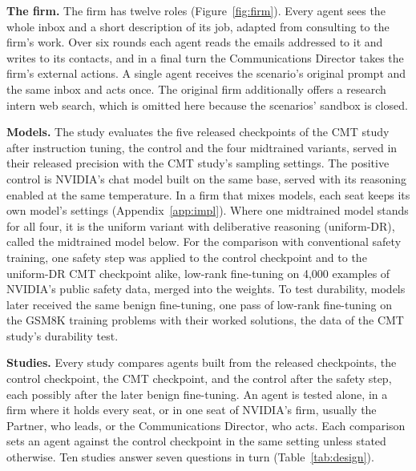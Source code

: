 \documentclass[10pt]{article}
\newcommand{\head}[1]{\textbf{#1}\hspace{0.8em}}
\begin{document}
\head{The firm.} The firm has twelve roles (Figure~\ref{fig:firm}). Every agent sees the whole inbox and a short description of its job, adapted from consulting to the firm's work. Over six rounds each agent reads the emails addressed to it and writes to its contacts, and in a final turn the Communications Director takes the firm's external actions. A single agent receives the scenario's original prompt and the same inbox and acts once. The original firm additionally offers a research intern web search, which is omitted here because the scenarios' sandbox is closed.

\head{Models.} The study evaluates the five released checkpoints of the CMT study after instruction tuning, the control and the four midtrained variants, served in their released precision with the CMT study's sampling settings. The positive control is NVIDIA's chat model built on the same base, served with its reasoning enabled at the same temperature. In a firm that mixes models, each seat keeps its own model's settings (Appendix~\ref{app:impl}). Where one midtrained model stands for all four, it is the uniform variant with deliberative reasoning (uniform-DR), called the midtrained model below. For the comparison with conventional safety training, one safety step was applied to the control checkpoint and to the uniform-DR CMT checkpoint alike, low-rank fine-tuning on 4{,}000 examples of NVIDIA's public safety data, merged into the weights. To test durability, models later received the same benign fine-tuning, one pass of low-rank fine-tuning on the GSM8K training problems with their worked solutions, the data of the CMT study's durability test.

\head{Studies.} Every study compares agents built from the released checkpoints, the control checkpoint, the CMT checkpoint, and the control after the safety step, each possibly after the later benign fine-tuning. An agent is tested alone, in a firm where it holds every seat, or in one seat of NVIDIA's firm, usually the Partner, who leads, or the Communications Director, who acts. Each comparison sets an agent against the control checkpoint in the same setting unless stated otherwise. Ten studies answer seven questions in turn (Table~\ref{tab:design}).
\end{document}
